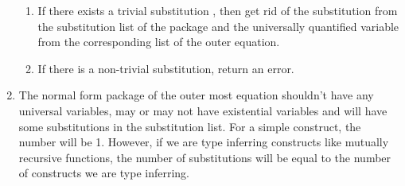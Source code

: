 \documentclass[11pt]{article}
\begin{document}
\begin{enumerate}
\begin{enumerate}
            \item If there exists a trivial substitution , then get rid of the substitution from the substitution list of the package and the universally quantified variable from the corresponding list of the outer equation.
            \item If there is a non-trivial substitution, return an error.
        \end{enumerate}
    \item The normal form package of the outer most equation shouldn't have any universal variables, may or may not have existential variables and will have some substitutions in the substitution list. For a simple construct, the number will be 1. However, if we are type inferring constructs like mutually recursive functions, the number of substitutions will be equal to the number of constructs we are type inferring.
    \end{enumerate}
\end{document}
